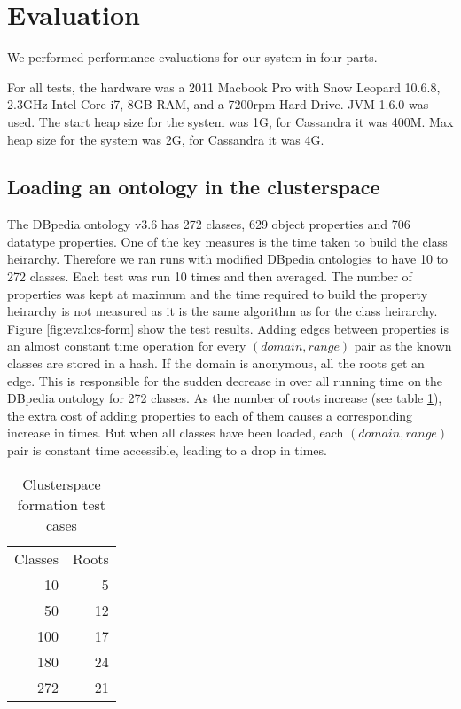 \documentclass[conference]{IEEEtran}
\begin{document}
\section{Evaluation}

We performed performance evaluations for our system in four parts.

For all tests, the hardware was a 2011 Macbook Pro with Snow Leopard 10.6.8,
2.3GHz Intel Core i7, 8GB RAM, and a 7200rpm Hard Drive.
JVM 1.6.0 was used. The start heap size for the system was 1G, for Cassandra it
was 400M. Max heap size for the system was 2G, for Cassandra it was 4G.

\subsection{Loading an ontology in the clusterspace}

The DBpedia ontology v3.6 has 272 classes, 629 object properties and 706
datatype properties. One of the key measures is the time taken to build the
class heirarchy. Therefore we ran runs with modified DBpedia ontologies to have
10 to 272 classes. Each test was run 10 times and then averaged. The number of
properties was kept at maximum and the time required to build the property
heirarchy is not measured as it is the same algorithm as for the class
heirarchy. Figure \ref{fig:eval:cs-form} show the test results. Adding edges
between properties is an almost constant time operation for every
$(domain,range)$ pair as the known classes are stored in a hash. If the
domain is anonymous, all the roots get an edge. This is responsible for the
sudden decrease in over all running time on the DBpedia ontology for 272
classes. As the number of roots increase (see table \ref{tbl:cs-form-time}),
the extra cost of adding properties to each of them causes a corresponding
increase in times. But when all classes have been loaded, each
$(domain,range)$ pair is constant time accessible, leading to a drop in
times.

\begin{table}
    \caption{Clusterspace formation test cases}
    \label{tbl:cs-form-time}
    \begin{center}
        \begin{tabular}{ r r }
            \hline
            Classes & Roots\\
            10 & 5\\
            50 & 12\\
            100 & 17\\
            180 & 24\\
            272 & 21\\
            \hline
        \end{tabular}
    \end{center}
\end{table}
\end{document}

